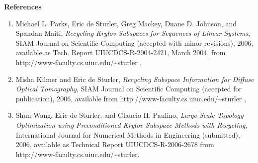 \documentclass{report}
\begin{document}
\noindent
{\bf References}
\begin{enumerate}
\item
Michael L. Parks, Eric de Sturler, Greg Mackey, Duane D. Johnson, and Spandan Maiti,
{\em Recycling Krylov Subspaces for Sequences of Linear Systems}, SIAM
Journal on Scientific Computing (accepted with minor revisions), 2006,
available as Tech. Report
UIUCDCS-R-2004-2421, March 2004, from http://www-faculty.cs.uiuc.edu/\~{}sturler ,

\item
Misha Kilmer and Eric de Sturler,
{\em Recycling Subspace Information for Diffuse Optical Tomography},
SIAM Journal on Scientific Computing (accepted for publication),
2006, available from
\newline http://www-faculty.cs.uiuc.edu/\~{}sturler ,

\item
Shun Wang, Eric de Sturler, and Glaucio H. Paulino,
{\em Large-Scale Topology Optimization using Preconditioned Krylov
Subspace Methods with Recycling},
International Journal for Numerical Methods in Engineering (submitted), 2006,
available as Technical Report UIUCDCS-R-2006-2678
from http://www-faculty.cs.uiuc.edu/\~{}sturler.
\end{enumerate}
\end{document}
